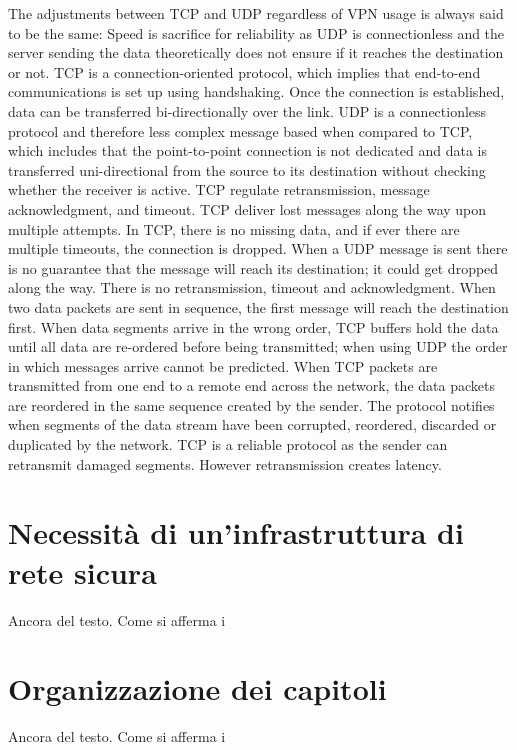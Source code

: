 The adjustments between TCP and UDP regardless of VPN usage is always said to be the same: Speed is sacrifice for reliability as UDP is connectionless and the server sending the data theoretically does not ensure if it reaches the destination or not.
TCP is a connection-oriented protocol, which implies that end-to-end communications is set up using handshaking. Once the connection is established, data can be transferred bi-directionally over the link.
UDP is a connectionless protocol and therefore less complex message based when compared to TCP, which includes that the point-to-point connection is not dedicated and data is transferred uni-directional from the source to its destination without checking whether the receiver is active.
TCP regulate retransmission, message acknowledgment, and timeout. TCP deliver lost messages along the way upon multiple attempts.
In TCP, there is no missing data, and if ever there are multiple timeouts, the connection is dropped.
When a UDP message is sent there is no guarantee that the message will reach its destination; it could get dropped along the way. There is no retransmission, timeout and acknowledgment. When two data packets are sent in sequence, the first message will reach the destination first.
When data segments arrive in the wrong order, TCP buffers hold the data until all data are re-ordered before being transmitted; when using UDP the order in which messages arrive cannot be predicted.
When TCP packets are transmitted from one end to a remote end across the network, the data packets are reordered in the same sequence created by the sender. The protocol notifies when segments of the data stream have been corrupted, reordered, discarded or duplicated by the network. TCP is a reliable protocol as the sender can retransmit damaged segments. However retransmission creates latency.


\section{Necessità di un'infrastruttura di rete sicura}

Ancora del testo. Come si afferma i
\section{Organizzazione dei capitoli}

Ancora del testo. Come si afferma i


